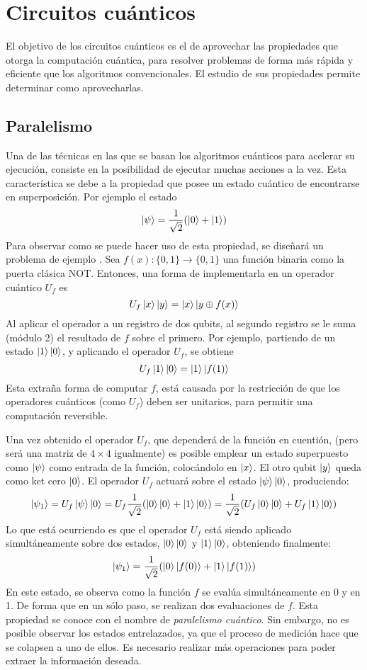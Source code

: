 \chapter{Circuitos cuánticos}
El objetivo de los circuitos cuánticos es el de aprovechar las propiedades que 
otorga la computación cuántica, para resolver problemas de forma más rápida y 
eficiente que los algoritmos convencionales. El estudio de sus propiedades 
permite determinar como aprovecharlas.

\section{Paralelismo}
Una de las técnicas en las que se basan los algoritmos cuánticos para acelerar 
su ejecución, consiste en la posibilidad de ejecutar muchas acciones a la vez.  
Esta característica se debe a la propiedad que posee un estado cuántico de 
encontrarse en superposición. Por ejemplo el estado
%
$$ \ket{\psi} = \frac{1}{\sqrt 2}(\ket{0} + \ket{1}) $$
%
Para observar como se puede hacer uso de esta propiedad, se diseñará un problema 
de ejemplo \cite{nielsen00}. Sea $f(x): \{0,1\} \rightarrow \{0,1\}$ una función 
binaria como la puerta clásica NOT. Entonces, una forma de implementarla en un 
operador cuántico $U_f$ es
%
$$ U_f \ket{x}\ket{y} = \ket{x}\ket{y \oplus f(x)} $$
%
Al aplicar el operador a un registro de dos qubits, al segundo registro se le 
suma (módulo 2) el resultado de $f$ sobre el primero. Por ejemplo, partiendo de 
un estado $\ket{1}\ket{0}$, y aplicando el operador $U_f$, se obtiene
%
$$ U_f \ket{1}\ket{0} = \ket{1}\ket{f(1)} $$
%
Esta extraña forma de computar $f$, está causada por la restricción de que los 
operadores cuánticos (como $U_f$) deben ser unitarios, para permitir una 
computación reversible.

Una vez obtenido el operador $U_f$, que dependerá de la función en cuentión, 
(pero será una matriz de $4 \times 4$ igualmente) es posible emplear un estado 
superpuesto como $\ket{\psi}$ como entrada de la función, colocándolo en 
$\ket{x}$. El otro qubit $\ket{y}$ queda como ket cero $\ket{0}$.
El operador $U_f$ actuará sobre el estado $\ket{\psi}\ket{0}$, produciendo:
$$ \ket{\psi_{1}} = U_f\ket{\psi}\ket{0} = U_f\frac{1}{\sqrt 2}(\ket{0}\ket{0} + 
\ket{1}\ket{0}) =
\frac{1}{\sqrt 2}(U_f\ket{0}\ket{0} + U_f\ket{1}\ket{0})$$
%
Lo que está ocurriendo es que el operador $U_f$ está siendo aplicado 
simultáneamente sobre dos estados, $\ket{0}\ket{0}$ y $\ket{1}\ket{0}$, 
obteniendo finalmente:
%
$$ \ket{\psi_{1}} = \frac{1}{\sqrt 2}(\ket{0}\ket{f(0)} + \ket{1}\ket{f(1)}) $$
%
En este estado, se observa como la función $f$ se evalúa simultáneamente en 0 y 
en 1. De forma que en un sólo paso, se realizan dos evaluaciones de $f$. Esta 
propiedad se conoce con el nombre de \textit{paralelismo cuántico}.
Sin embargo, no es posible observar los estados entrelazados, ya que el proceso 
de medición hace que se colapsen a uno de ellos. Es necesario realizar más 
operaciones para poder extraer la información deseada.

